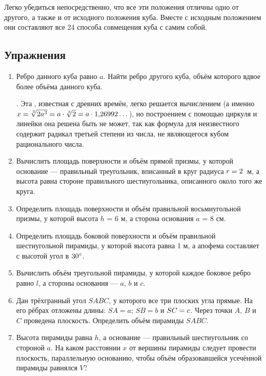 Легко убедиться непосредственно, что все эти положения отличны одно от другого, а также и от исходного положения куба.
Вместе с исходным положением они составляют все 24 способа совмещения куба с самим собой.

{\small

\subsection*{Упражнения}

\begin{enumerate}[noitemsep]

\item
Ребро данного куба равно $a$.
Найти ребро другого куба, объём которого вдвое более объёма данного куба.

\medskip

.
Эта , известная с древних времён, легко решается вычислением (а именно $x\z=\sqrt[3]{2a^3}\z=a\cdot\sqrt[3]{2}\z=a\cdot1{,}26992 \dots $), но построением с помощью циркуля и линейки она решена быть не может, так как формула для неизвестного содержит радикал третьей степени из числа, не являющегося кубом рационального числа.

\item
Вычислить площадь поверхности и объём прямой призмы, у которой основание — правильный треугольник, вписанный в круг радиуса $r \z= 2$~м, а высота равна стороне правильного шестиугольника, описанного около того же круга.

\item
Определить площадь поверхности и объём правильной восьмиугольной призмы, у которой высота $h$ = 6 м, а сторона основания $a$ = 8 см.

\item
Определить площадь боковой поверхности и объём правильной шестиугольной пирамиды, у которой высота равна 1 м, а апофема составляет с высотой угол в $30\degree$.

\item
Вычислить объём треугольной пирамиды, у которой каждое боковое ребро равно $l$, а стороны основания — $a$, $b$ и $c$.

\item
Дан трёхгранный угол $SABC$, у которого все три плоских угла прямые.
На его рёбрах отложены длины: $SA = a$;
$SB = b$ и $SC\z=c$.
Через точки $A$, $B$ и $C$ проведена плоскость.
Определить объём пирамиды $SABC$.

\item
Высота пирамиды равна $h$, а основание — правильный шестиугольник со стороной $a$.
На каком расстоянии $x$ от вершины пирамиды следует провести плоскость, параллельную основанию, чтобы объём образовавшейся усечённой пирамиды равнялся $V$?


\end{enumerate}}

